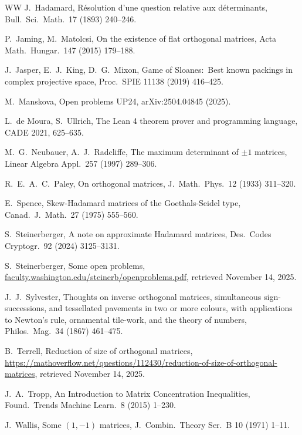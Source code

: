 \documentclass[11pt]{article}
\theoremstyle{plain}
\theoremstyle{definition}
\begin{document}
\begin{thebibliography}{WW}
J.\ Hadamard,
R\'{e}solution d'une question relative aux d\'{e}terminants,
Bull.\ Sci.\ Math.\ 17 (1893) 240--246.

P.\ Jaming, M.\ Matolcsi,
On the existence of flat orthogonal matrices,
Acta Math.\ Hungar.\ 147 (2015) 179--188.

J.\ Jasper, E.\ J.\ King, D.\ G.\ Mixon,
Game of Sloanes:\ Best known packings in complex projective space,
Proc.\ SPIE 11138 (2019) 416--425.

M.\ Manskova,
Open problems UP24,
arXiv:2504.04845 (2025).

L.\ de Moura, S.\ Ullrich,
The Lean 4 theorem prover and programming language,
CADE 2021, 625--635.

M.\ G.\ Neubauer, A.\ J.\ Radcliffe,
The maximum determinant of $\pm1$ matrices,
Linear Algebra Appl.\ 257 (1997) 289--306.

R.\ E.\ A.\ C.\ Paley,
On orthogonal matrices,
J.\ Math.\ Phys.\ 12 (1933) 311--320.

E.\ Spence,
Skew-Hadamard matrices of the Goethals-Seidel type,
Canad.\ J.\ Math.\ 27 (1975) 555--560.

S.\ Steinerberger,
A note on approximate Hadamard matrices,
Des.\ Codes Cryptogr.\ 92 (2024) 3125--3131.

S.\ Steinerberger,
Some open problems,
\url{faculty.washington.edu/steinerb/openproblems.pdf}, 
retrieved November 14, 2025.

J.\ J.\ Sylvester,
Thoughts on inverse orthogonal matrices, simultaneous sign-successions, and tessellated pavements in two or more colours, with applications to Newton's rule, ornamental tile-work, and the theory of numbers,
Philos.\ Mag.\ 34 (1867) 461--475.

B.\ Terrell,
Reduction of size of orthogonal matrices,
\url{https://mathoverflow.net/questions/112430/reduction-of-size-of-orthogonal-matrices},
retrieved November 14, 2025.

J.\ A.\ Tropp,
An Introduction to Matrix Concentration Inequalities,
Found.\ Trends Machine Learn.\ 8 (2015) 1--230.

J.\ Wallis,
Some $(1,-1)$ matrices,
J.\ Combin.\ Theory Ser.\ B 10 (1971) 1--11.

\end{thebibliography}
\end{document}
